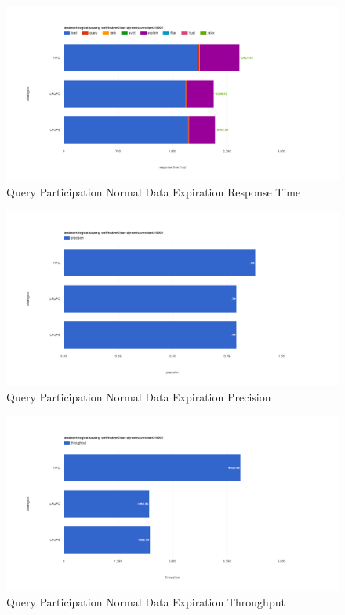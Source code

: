 \begin{figure}[!htbp]
    \centering
    \includegraphics[width=\textwidth]{img/app3-qp-normal-r.png}
    \caption{Query Participation Normal Data Expiration Response Time}
\end{figure}
\begin{figure}[!htbp]
    \centering
    \includegraphics[width=\textwidth]{img/app3-qp-normal-p.png}
    \caption{Query Participation Normal Data Expiration Precision}
\end{figure}
\begin{figure}[!htbp]
    \centering
    \includegraphics[width=\textwidth]{img/app3-qp-normal-t.png}
    \caption{Query Participation Normal Data Expiration Throughput}
\end{figure}

